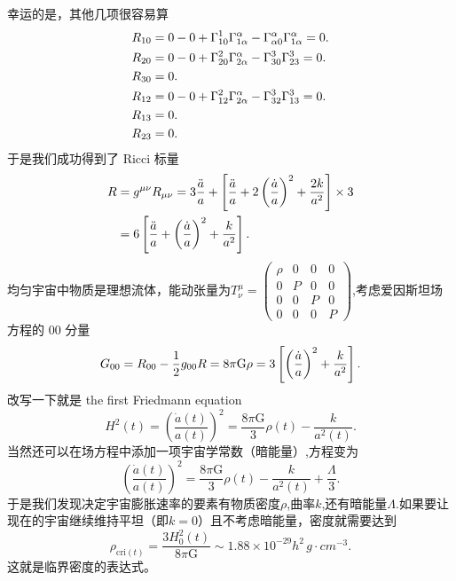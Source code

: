 \documentclass[../天体物理基础.tex]{subfiles}
\begin{document}
幸运的是，其他几项很容易算
\begin{align}
R_{10}&=0-0+\Gamma_{10}^{1}\Gamma_{1\alpha}^{\alpha}-\Gamma_{\alpha0}^{\alpha}\Gamma_{1\alpha}^{\alpha}=0.\notag\\
R_{20}&=0-0+\Gamma_{20}^{2}\Gamma_{2\alpha}^{\alpha}-\Gamma_{30}^{3}\Gamma_{23}^{3}=0.\notag\\
R_{30}&=0.\notag\\
R_{12}&=0-0+\Gamma_{12}^{2}\Gamma_{2\alpha}^{\alpha}-\Gamma_{32}^{3}\Gamma_{13}^{3}=0.\notag\\
R_{13}&=0.\notag\\
R_{23}&=0.\notag
\end{align}
于是我们成功得到了 Ricci 标量
\begin{align}
R&=g^{\mu\nu}R_{\mu\nu}=3\frac{\ddot a}{a}+\left[\frac{\ddot a}{a}+2\left(\frac{\dot a}{a}\right)^{2}+\frac{2k}{a^{2}}\right]\times3\notag\\
&=6\left[\frac{\ddot a}{a}+\left(\frac{\dot a}{a}\right)^{2}+\frac{k}{a^{2}}\right].\notag
\end{align}
均匀宇宙中物质是理想流体，能动张量为$T^{\mu}_{\nu}=\begin{pmatrix}
\rho & 0 & 0 & 0\\
0 & P & 0 & 0\\
0 & 0 & P & 0\\
0 & 0 & 0 & P
\end{pmatrix}$,考虑爱因斯坦场方程的 00 分量
\begin{equation}
G_{00}=R_{00}-\frac{1}{2}g_{00}R=8\pi\mathrm{G}\rho=3\left[\left(\frac{\dot a}{a}\right)^{2}+\frac{k}{a^{2}}\right].\notag
\end{equation}
改写一下就是 the first Friedmann equation
\begin{equation}
H^{2}\left(t\right)=\left(\frac{\dot{a}\left(t\right)}{a\left(t\right)}\right)^{2}=\frac{8\pi\mathrm{G}}{3}\rho\left(t\right)-\frac{k}{a^{2}\left(t\right)}.
\end{equation}
当然还可以在场方程中添加一项宇宙学常数（暗能量）,方程变为
\begin{equation}
\left(\frac{\dot{a}\left(t\right)}{a\left(t\right)}\right)^{2}=\frac{8\pi\mathrm{G}}{3}\rho\left(t\right)-\frac{k}{a^{2}\left(t\right)}+\frac{\Lambda}{3}.\label{1.6.8}
\end{equation}
于是我们发现决定宇宙膨胀速率的要素有物质密度$\rho$,曲率$k$,还有暗能量$\Lambda$.如果要让现在的宇宙继续维持平坦（即$k=0$）且不考虑暗能量，密度就需要达到
\begin{equation}
\rho_{\text{cri}\left(t\right)}=\frac{3H_{0}^{2}\left(t\right)}{8\pi\mathrm{G}}\sim1.88\times10^{-29}h^{2}\,\unit{g\cdot{}cm^{-3}}.
\end{equation}
这就是临界密度的表达式。
\end{document}
